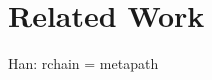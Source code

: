 \documentclass{acm_proc_article-sp}
\begin{document}
%
%
%
%
\section{Related Work} \label{sec:related}
Han: rchain = metapath
\end{document}
